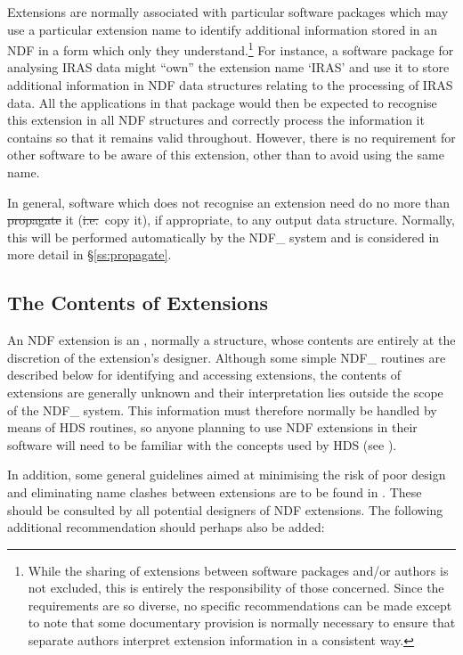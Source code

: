 Extensions are normally associated with particular software packages which
may use a particular extension name to identify additional information
stored in an NDF in a form which only they understand.\footnote{While the
sharing of extensions between software packages and/or authors is not
excluded, this is entirely the responsibility of those concerned. Since the
requirements are so diverse, no specific recommendations can be made except
to note that some documentary provision is normally necessary to ensure that
separate authors interpret extension information in a consistent way.} 
For instance, a software package for analysing IRAS data might ``own'' the
extension name `IRAS' and use it to store additional information in NDF data
structures relating to the processing of IRAS data. 
All the applications in that package would then be expected to recognise
this extension in all NDF structures and correctly process the information
it contains so that it remains valid throughout. 
However, there is no requirement for other software to be aware of this
extension, other than to avoid using the same name.

In general, software which does not recognise an extension need do no more
than \st{propagate\/} it (\st{i.e.}\ copy it), if appropriate, to any output
data structure. 
Normally, this will be performed automatically by the NDF\_ system and is
considered in more detail in \S\ref{ss:propagate}. 

\subsection{The Contents of Extensions}

An NDF extension is an , normally
a structure, whose contents are entirely at the discretion of the
extension's designer.
Although some simple NDF\_ routines are described below for identifying and
accessing extensions, the contents of extensions are generally unknown and
their interpretation lies outside the scope of the NDF\_ system.
This information must therefore normally be handled by means of HDS
routines, so anyone planning to use NDF extensions in their software will
need to be familiar with the concepts used by HDS (see
).

In addition, some general guidelines aimed at minimising the risk of poor
design and eliminating name clashes between extensions are to be found in
. 
These should be consulted by all potential designers of NDF extensions. 
The following additional recommendation should perhaps also be added:

